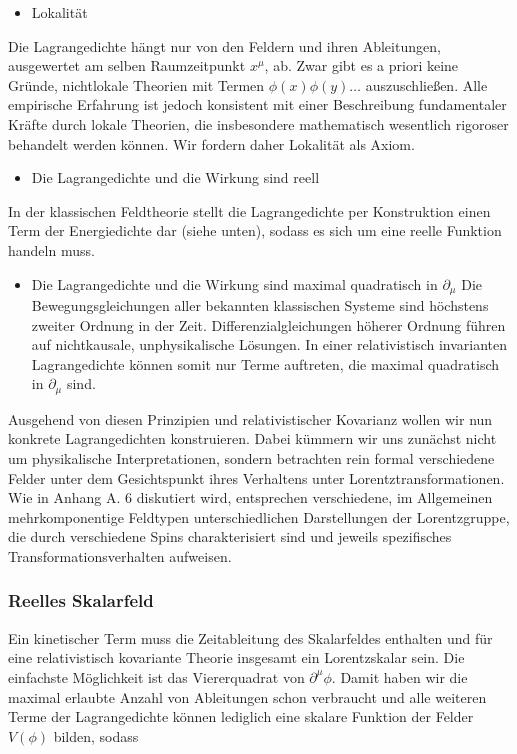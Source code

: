 \documentclass[10pt, letterpaper]{article}
\begin{document}
\begin{itemize}
  \item Lokalität
\end{itemize}

Die Lagrangedichte hängt nur von den Feldern und ihren Ableitungen, ausgewertet am selben Raumzeitpunkt $x^{\mu}$, ab. Zwar gibt es a priori keine Gründe, nichtlokale Theorien mit Termen $\phi(x) \phi(y) \ldots$ auszuschließen. Alle empirische Erfahrung ist jedoch konsistent mit einer Beschreibung fundamentaler Kräfte durch lokale Theorien, die insbesondere mathematisch wesentlich rigoroser behandelt werden können. Wir fordern daher Lokalität als Axiom.

\begin{itemize}
  \item Die Lagrangedichte und die Wirkung sind reell
\end{itemize}

In der klassischen Feldtheorie stellt die Lagrangedichte per Konstruktion einen Term der Energiedichte dar (siehe unten), sodass es sich um eine reelle Funktion handeln muss.

\begin{itemize}
  \item Die Lagrangedichte und die Wirkung sind maximal quadratisch in $\partial_{\mu}$ Die Bewegungsgleichungen aller bekannten klassischen Systeme sind höchstens zweiter Ordnung in der Zeit. Differenzialgleichungen höherer Ordnung führen auf nichtkausale, unphysikalische Lösungen. In einer relativistisch invarianten Lagrangedichte können somit nur Terme auftreten, die maximal quadratisch in $\partial_{\mu}$ sind.
\end{itemize}

Ausgehend von diesen Prinzipien und relativistischer Kovarianz wollen wir nun konkrete Lagrangedichten konstruieren. Dabei kümmern wir uns zunächst nicht um physikalische Interpretationen, sondern betrachten rein formal verschiedene Felder unter dem Gesichtspunkt ihres Verhaltens unter Lorentztransformationen. Wie in Anhang A. 6 diskutiert wird, entsprechen verschiedene, im Allgemeinen mehrkomponentige Feldtypen unterschiedlichen Darstellungen der Lorentzgruppe, die durch verschiedene Spins charakterisiert sind und jeweils spezifisches Transformationsverhalten aufweisen.

\subsubsection*{Reelles Skalarfeld}
Ein kinetischer Term muss die Zeitableitung des Skalarfeldes enthalten und für eine relativistisch kovariante Theorie insgesamt ein Lorentzskalar sein. Die einfachste Möglichkeit ist das Viererquadrat von $\partial^{\mu} \phi$. Damit haben wir die maximal erlaubte Anzahl von Ableitungen schon verbraucht und alle weiteren Terme der Lagrangedichte können lediglich eine skalare Funktion der Felder $V(\phi)$ bilden, sodass
\end{document}
